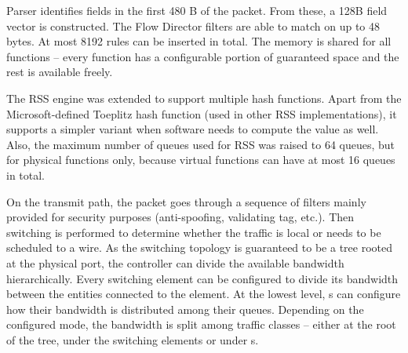 Parser identifies fields in the first 480 B of the packet. From these, a 128B
field vector is constructed. The Flow Director filters are able to match on up
to 48 bytes. At most 8192 rules can be inserted in total. The memory is shared
for all functions -- every function has a configurable portion of guaranteed
space and the rest is available freely.

The RSS engine was extended to support multiple hash functions. Apart from the
Microsoft-defined Toeplitz hash function (used in other RSS implementations),
it supports a simpler variant when software needs to compute the value as well.
Also, the maximum number of queues used for RSS was raised to 64 queues, but
for physical functions only, because virtual functions can have at most 16
queues in total.

On the transmit path, the packet goes through a sequence of filters mainly
provided for security purposes (anti-spoofing, validating  tag, etc.).
Then switching is performed to determine whether the traffic is local or
needs to be scheduled to a wire. As the switching topology is guaranteed to be
a tree rooted at the physical port, the controller can divide the available
bandwidth hierarchically. Every switching element can be configured to
divide its bandwidth between the entities connected to the element. At the lowest
level, s can configure how their bandwidth is distributed among their
queues. Depending on the configured mode, the bandwidth is split among traffic
classes -- either at the root of the tree, under the switching elements or
under s.

